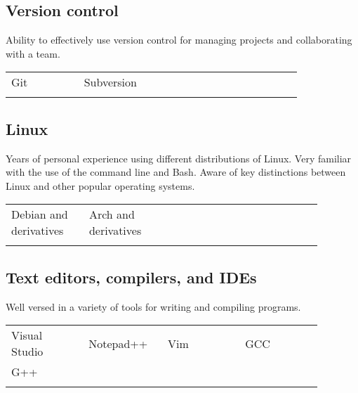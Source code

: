\documentclass[letterpaper]{article}
\begin{document}
        \subsection*{Version control}
        Ability to effectively use version control for managing projects and collaborating with a team.

        \begin{center}
        \begin{tabular}{p{0.22\linewidth} p{0.22\linewidth} p{0.22\linewidth} p{0.22\linewidth}}
            \\
            Git & Subversion &&\\
            \\
        \end{tabular}
        \end{center}

        \subsection*{Linux}

        Years of personal experience using different distributions of Linux.
        Very familiar with the use of the command line and Bash.
        Aware of key distinctions between Linux and other popular operating systems.

        \begin{center}
        \begin{tabular}{p{0.22\linewidth} p{0.22\linewidth} p{0.22\linewidth} p{0.22\linewidth}}
            \\
            Debian and derivatives & Arch and derivatives &&\\
            \\
        \end{tabular}
        \end{center}

        \subsection*{Text editors, compilers, and IDEs}
        Well versed in a variety of tools for writing and compiling programs.

        \begin{center}
        \begin{tabular}{p{0.22\linewidth} p{0.22\linewidth} p{0.22\linewidth} p{0.22\linewidth}}
            \\
            Visual Studio & Notepad++ & Vim & GCC \\
            G++ &&&\\
            \\
        \end{tabular}
        \end{center}
\end{document}
